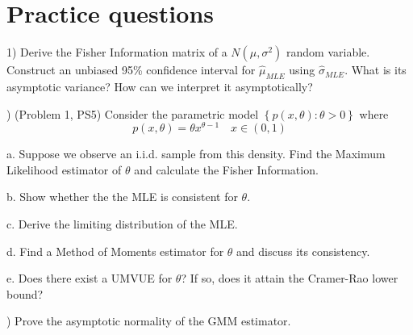 \documentclass[12pt,english]{article}
\begin{document}
\section{Practice questions}

1) Derive the Fisher Information matrix of a $N(\mu, \sigma^{2})$ random variable. Construct an unbiased 95\% confidence interval for $\widehat{\mu}_{MLE}$ using $\widehat{\sigma}_{MLE}$. What is its asymptotic variance? How can we interpret it asymptotically?

\vspace{1em}
) (Problem 1, PS5) Consider the parametric model $\left\{ p\left( x,\theta \right)
:\theta >0\right\} $ where
\begin{equation*}
p\left( x,\theta \right) =\theta x^{\theta -1}\text{~~~}x\in \left(
0,1\right)
\end{equation*}

a. Suppose we observe an i.i.d. sample from this density. Find the
	Maximum Likelihood estimator of $\theta $ and calculate the Fisher
	Information.
	
b. Show whether the the MLE is consistent for $\theta$.
	
c. Derive the limiting distribution of the MLE.
	
d. Find a Method of Moments estimator for $\theta$ and discuss its
	consistency.
	
e. Does there exist a UMVUE for $\theta$? If so, does it attain the
	Cramer-Rao lower bound?

\vspace{1em}
) Prove the asymptotic normality of the GMM estimator.
\end{document}
